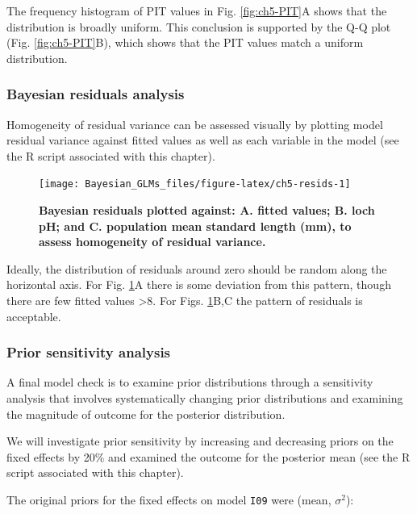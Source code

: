 \documentclass[
]{book}
\begin{document}
The frequency histogram of PIT values in Fig. \ref{fig:ch5-PIT}A shows that the distribution is broadly uniform. This conclusion is supported by the Q-Q plot (Fig. \ref{fig:ch5-PIT}B), which shows that the PIT values match a uniform distribution.

\hypertarget{pois-resids}{%
\subsubsection{Bayesian residuals analysis}\label{pois-resids}}

Homogeneity of residual variance can be assessed visually by plotting model residual variance against fitted values as well as each variable in the model (see the R script associated with this chapter).



\begin{figure}

{\centering \texttt{[image: Bayesian\_GLMs\_files/figure-latex/ch5-resids-1]} 

}

\caption{\textbf{Bayesian residuals plotted against: A. fitted values; B. loch pH; and C. population mean standard length (mm), to assess homogeneity of residual variance.}}\label{fig:ch5-resids}
\end{figure}

Ideally, the distribution of residuals around zero should be random along the horizontal axis. For Fig. \ref{fig:ch5-resids}A there is some deviation from this pattern, though there are few fitted values \textgreater8. For Figs. \ref{fig:ch5-resids}B,C the pattern of residuals is acceptable.

\hypertarget{pois-sens}{%
\subsubsection{Prior sensitivity analysis}\label{pois-sens}}

A final model check is to examine prior distributions through a sensitivity analysis that involves systematically changing prior distributions and examining the magnitude of outcome for the posterior distribution.

We will investigate prior sensitivity by increasing and decreasing priors on the fixed effects by 20\% and examined the outcome for the posterior mean (see the R script associated with this chapter).

The original priors for the fixed effects on model \texttt{I09} were (mean, \(\sigma^2\)):
\end{document}
